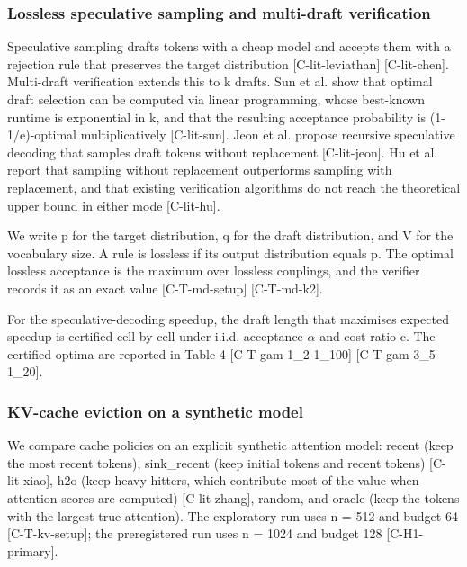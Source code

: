 \documentclass[10pt,twocolumn]{article}
\begin{document}
\subsubsection*{Lossless speculative sampling and multi-draft verification}

Speculative sampling drafts tokens with a cheap model and accepts them with a rejection rule that preserves the target distribution {\scriptsize[C-lit-leviathan]} {\scriptsize[C-lit-chen]}. Multi-draft verification extends this to k drafts. Sun et al. show that optimal draft selection can be computed via linear programming, whose best-known runtime is exponential in k, and that the resulting acceptance probability is (1-1/e)-optimal multiplicatively {\scriptsize[C-lit-sun]}. Jeon et al. propose recursive speculative decoding that samples draft tokens without replacement {\scriptsize[C-lit-jeon]}. Hu et al. report that sampling without replacement outperforms sampling with replacement, and that existing verification algorithms do not reach the theoretical upper bound in either mode {\scriptsize[C-lit-hu]}.

We write p for the target distribution, q for the draft distribution, and V for the vocabulary size. A rule is lossless if its output distribution equals p. The optimal lossless acceptance is the maximum over lossless couplings, and the verifier records it as an exact value {\scriptsize[C-T-md-setup]} {\scriptsize[C-T-md-k2]}.

For the speculative-decoding speedup, the draft length that maximises expected speedup is certified cell by cell under i.i.d. acceptance $\alpha$ and cost ratio c. The certified optima are reported in Table 4 {\scriptsize[C-T-gam-1\_2-1\_100]} {\scriptsize[C-T-gam-3\_5-1\_20]}.

\subsubsection*{KV-cache eviction on a synthetic model}

We compare cache policies on an explicit synthetic attention model: recent (keep the most recent tokens), sink\_recent (keep initial tokens and recent tokens) {\scriptsize[C-lit-xiao]}, h2o (keep heavy hitters, which contribute most of the value when attention scores are computed) {\scriptsize[C-lit-zhang]}, random, and oracle (keep the tokens with the largest true attention). The exploratory run uses n = 512 and budget 64 {\scriptsize[C-T-kv-setup]}; the preregistered run uses n = 1024 and budget 128 {\scriptsize[C-H1-primary]}.
\end{document}
